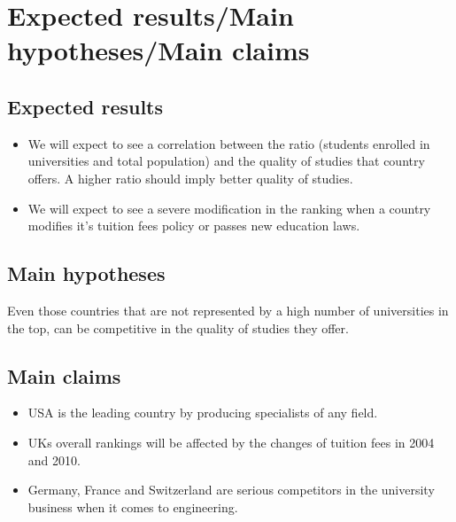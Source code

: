 \section{Expected results/Main hypotheses/Main claims}
\subsection{Expected results} 
\begin{itemize}
\item We will expect to see a correlation between the ratio (students enrolled in universities and total population) and the quality of studies that country offers. A higher ratio should imply better quality of studies.
\item We will expect to see a severe modification in the ranking when a country modifies it's tuition fees policy or passes new education laws.
\end{itemize}
\subsection{Main hypotheses}
Even those countries that are not represented by a high number of universities in the top, can be competitive in the quality of studies they offer. 
\subsection{Main claims}
\begin{itemize}
\item USA is the leading country by producing specialists of any field.
\item UKs overall rankings will be affected by the changes of tuition fees in 2004 and 2010.
\item Germany, France and Switzerland are serious competitors in the university business when it comes to engineering. 
\end{itemize}